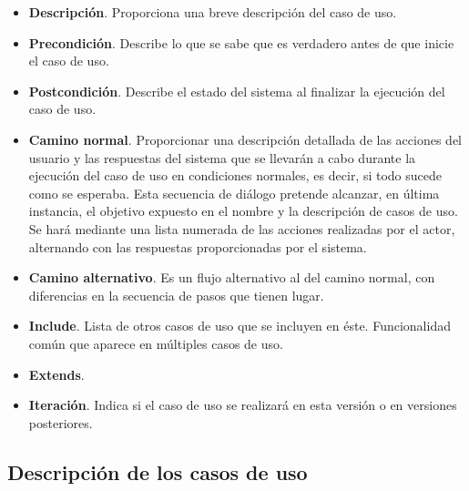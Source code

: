 \begin{itemize}
					\item \textbf{Descripción}. Proporciona una breve descripción del caso de uso.

					\item \textbf{Precondición}. Describe lo que se sabe que es verdadero antes de que inicie el caso de uso. 

					\item \textbf{Postcondición}. Describe el estado del sistema al finalizar la ejecución del caso de uso.

					\item \textbf{Camino normal}. Proporcionar una descripción detallada de las acciones del usuario y las respuestas del sistema que se llevarán a cabo durante la ejecución del caso de uso en condiciones normales, es decir, si todo sucede como se esperaba. Esta secuencia de diálogo pretende alcanzar, en última instancia, el objetivo expuesto en el nombre y la descripción de casos de uso. Se hará mediante una lista numerada de las acciones realizadas por el actor, alternando con las respuestas proporcionadas por el sistema.

					\item \textbf{Camino alternativo}. Es un flujo alternativo al del camino normal, con diferencias en la secuencia de pasos que tienen lugar. 

					\item \textbf{Include}. Lista de otros casos de uso que se incluyen en éste. Funcionalidad común que aparece en múltiples casos de uso.

					\item \textbf{Extends}. 

					\item \textbf{Iteración}. Indica si el caso de uso se realizará en esta versión o en versiones posteriores.

				\end{itemize}


			\subsection{Descripción de los casos de uso} %
			\label{sub:descripcion_de_los_casos_de_uso}


